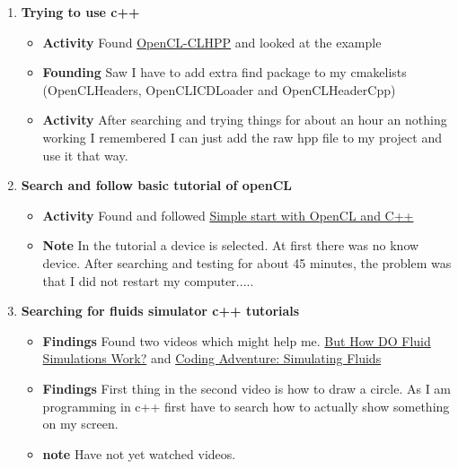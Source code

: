 \documentclass{article}
\begin{document}
\begin{enumerate}
    \item \textbf{Trying to use c++}
          \begin{itemize}
              \item \textbf{Activity} Found \href{https://github.com/KhronosGroup/OpenCL-CLHPP}{OpenCL-CLHPP} and looked at the example
              \item \textbf{Founding} Saw I have to add extra find package to my cmakelists (OpenCLHeaders, OpenCLICDLoader and OpenCLHeaderCpp)
              \item \textbf{Activity} After searching and trying things for about an hour an nothing working I remembered I can just add the raw hpp file to my project and use it that way.
          \end{itemize}

    \item \textbf{Search and follow basic tutorial of openCL}
          \begin{itemize}
              \item \textbf{Activity} Found and followed \href{https://programmerclick.com/article/47811146604/}{Simple start with OpenCL and C++}
              \item \textbf{Note} In the tutorial a device is selected. At first there was no know device. After searching and testing for about 45 minutes, the problem was that I did not restart my computer.....
          \end{itemize}

    \item \textbf{Searching for fluids simulator c++ tutorials}
          \begin{itemize}
              \item \textbf{Findings} Found two videos which might help me. \href{https://www.youtube.com/watch?v=qsYE1wMEMPA}{But How DO Fluid Simulations Work?} and \href{https://www.youtube.com/watch?v=rSKMYc1CQHE}{Coding Adventure: Simulating Fluids}
              \item \textbf{Findings} First thing in the second video is how to draw a circle. As I am programming in c++ first have to search how to actually show something on my screen.
              \item \textbf{note} Have not yet watched videos.
          \end{itemize}


\end{enumerate}
\end{document}
